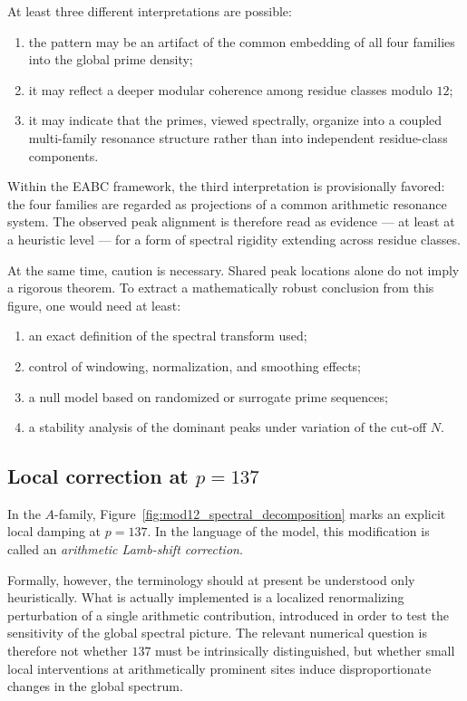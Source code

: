 \documentclass[11pt,a4paper]{amsart}
\theoremstyle{plain}
\theoremstyle{definition}
\theoremstyle{remark}
\begin{document}
	At least three different interpretations are possible:
	
	\begin{enumerate}[label=\arabic*.]
		\item the pattern may be an artifact of the common embedding of all four families into the global prime density;
		\item it may reflect a deeper modular coherence among residue classes modulo \(12\);
		\item it may indicate that the primes, viewed spectrally, organize into a coupled multi-family resonance structure rather than into independent residue-class components.
	\end{enumerate}
	
	Within the EABC framework, the third interpretation is provisionally favored: the four families are regarded as projections of a common arithmetic resonance system. The observed peak alignment is therefore read as evidence --- at least at a heuristic level --- for a form of spectral rigidity extending across residue classes.
	
	At the same time, caution is necessary. Shared peak locations alone do not imply a rigorous theorem. To extract a mathematically robust conclusion from this figure, one would need at least:
	\begin{enumerate}[label=\alph*)]
		\item an exact definition of the spectral transform used;
		\item control of windowing, normalization, and smoothing effects;
		\item a null model based on randomized or surrogate prime sequences;
		\item a stability analysis of the dominant peaks under variation of the cut-off \(N\).
	\end{enumerate}
	
	\subsection{Local correction at \(p=137\)}
	
	In the \(A\)-family, Figure~\ref{fig:mod12_spectral_decomposition} marks an explicit local damping at \(p=137\). In the language of the model, this modification is called an \emph{arithmetic Lamb-shift correction}.
	
	Formally, however, the terminology should at present be understood only heuristically. What is actually implemented is a localized renormalizing perturbation of a single arithmetic contribution, introduced in order to test the sensitivity of the global spectral picture. The relevant numerical question is therefore not whether \(137\) must be intrinsically distinguished, but whether small local interventions at arithmetically prominent sites induce disproportionate changes in the global spectrum.
	
\end{document}
